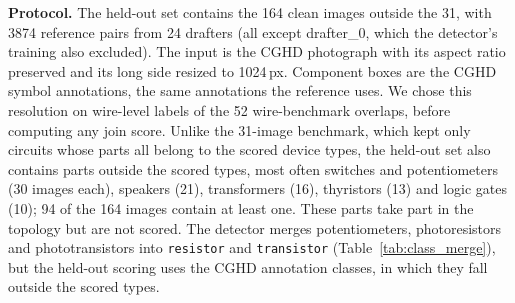\documentclass{ieeeaccess}
\begin{document}
\textbf{Protocol.} The held-out set contains the 164 clean images outside the 31, with 3874 reference pairs from 24 drafters (all except drafter\_0, which the detector's training also excluded). The input is the CGHD photograph with its aspect ratio preserved and its long side resized to 1024\,px. Component boxes are the CGHD symbol annotations, the same annotations the reference uses. We chose this resolution on wire-level labels of the 52 wire-benchmark overlaps, before computing any join score. Unlike the 31-image benchmark, which kept only circuits whose parts all belong to the scored device types, the held-out set also contains parts outside the scored types, most often switches and potentiometers (30 images each), speakers (21), transformers (16), thyristors (13) and logic gates (10); 94 of the 164 images contain at least one. These parts take part in the topology but are not scored. The detector merges potentiometers, photoresistors and phototransistors into \texttt{resistor} and \texttt{transistor} (Table~\ref{tab:class_merge}), but the held-out scoring uses the CGHD annotation classes, in which they fall outside the scored types.

\begin{table}[t]
\caption{Independent held-out benchmark (164 CGHD photographs, 24 drafters, 3874 reference pairs; annotated component boxes). {$\Delta$} is ours minus the comparator in micro-F1, with 95\% paired bootstrap CI. Every difference has Holm-adjusted $p=0.0006$, the resolution floor of the tests.}
\label{tab:cghd_ref}
\centering
\footnotesize
\setlength{\tabcolsep}{2.5pt}
\end{table}
\end{document}
